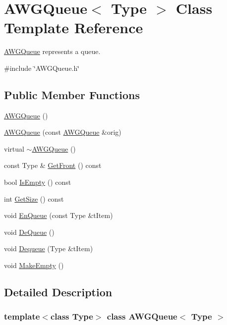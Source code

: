\hypertarget{classAWGQueue}{
\section{AWGQueue$<$ Type $>$ Class Template Reference}
\label{classAWGQueue}
}


\hyperlink{classAWGQueue}{AWGQueue} represents a queue.  


{\ttfamily \#include \char`\"{}AWGQueue.h\char`\"{}}\subsection*{Public Member Functions}
\begin{DoxyCompactItemize}
\item 
\hyperlink{classAWGQueue_acc697a692098f14f933e70318639bab2}{AWGQueue} ()
\item 
\hyperlink{classAWGQueue_ac0a6aa6cd1e1681c5b2ccc577095e56c}{AWGQueue} (const \hyperlink{classAWGQueue}{AWGQueue} \&orig)
\item 
virtual \hyperlink{classAWGQueue_ae7b463f710e30740339f63247e76a207}{$\sim$AWGQueue} ()
\item 
const Type \& \hyperlink{classAWGQueue_a8553079c1e8edd832226f7e25a1f53c6}{GetFront} () const 
\item 
bool \hyperlink{classAWGQueue_aea641c224cf00f838f92ef9f84ef99d0}{IsEmpty} () const 
\item 
int \hyperlink{classAWGQueue_af86ef02bdd68c2261615d8e5af017bc7}{GetSize} () const 
\item 
void \hyperlink{classAWGQueue_a2eadbdc35a395e441e7c05905217e763}{EnQueue} (const Type \&tItem)
\item 
void \hyperlink{classAWGQueue_afa93a1624254d57529c8d3fe95c560ca}{DeQueue} ()
\item 
void \hyperlink{classAWGQueue_a9f0de0508811cf9c866db01279b9fe87}{Dequeue} (Type \&tItem)
\item 
void \hyperlink{classAWGQueue_ac080dbd149a6403e35b0eb2445fdf4c2}{MakeEmpty} ()
\end{DoxyCompactItemize}


\subsection{Detailed Description}
\subsubsection*{template$<$class Type$>$ class AWGQueue$<$ Type $>$}

